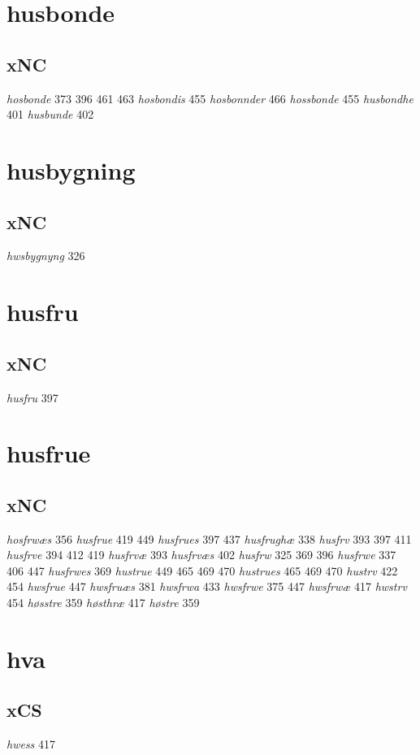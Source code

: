 \documentclass[a4paper,twocolumn]{article}
\begin{document}
\section{husbonde}
\label{sec:org5ab92d5}
\subsection{xNC}
\label{sec:org8f85af9}
\emph{hosbonde} 373 396 461 463 \emph{hosbondis} 455 \emph{hosbonnder} 466 \emph{hossbonde} 455 \emph{husbondhe} 401 \emph{husbunde} 402 
\section{husbygning}
\label{sec:orgfa62614}
\subsection{xNC}
\label{sec:org7fb47ae}
\emph{hwsbygnyng} 326 
\section{husfru}
\label{sec:org17c7cc5}
\subsection{xNC}
\label{sec:org6bf2695}
\emph{husfru} 397 
\section{husfrue}
\label{sec:org0a53a9f}
\subsection{xNC}
\label{sec:org438b704}
\emph{hosfrwæs} 356 \emph{husfrue} 419 449 \emph{husfrues} 397 437 \emph{husfrughæ} 338 \emph{husfrv} 393 397 411 \emph{husfrve} 394 412 419 \emph{husfrvæ} 393 \emph{husfrvæs} 402 \emph{husfrw} 325 369 396 \emph{husfrwe} 337 406 447 \emph{husfrwes} 369 \emph{hustrue} 449 465 469 470 \emph{hustrues} 465 469 470 \emph{hustrv} 422 454 \emph{hwsfrue} 447 \emph{hwsfruæs} 381 \emph{hwsfrwa} 433 \emph{hwsfrwe} 375 447 \emph{hwsfrwæ} 417 \emph{hwstrv} 454 \emph{høsstre} 359 \emph{høsthræ} 417 \emph{høstre} 359 
\section{hva}
\label{sec:orgac8b610}
\subsection{xCS}
\label{sec:orgdb43db2}
\emph{hwess} 417 
\end{document}
